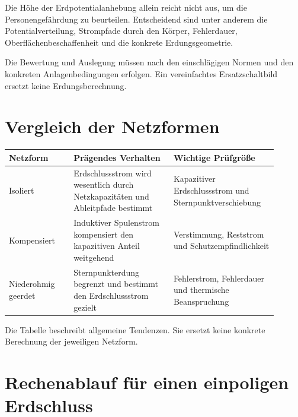 Die Höhe der Erdpotentialanhebung allein reicht nicht aus, um die
Personengefährdung zu beurteilen. Entscheidend sind unter anderem die
Potentialverteilung, Strompfade durch den Körper, Fehlerdauer,
Oberflächenbeschaffenheit und die konkrete Erdungsgeometrie.

Die Bewertung und Auslegung müssen nach den einschlägigen Normen und
den konkreten Anlagenbedingungen erfolgen. Ein vereinfachtes
Ersatzschaltbild ersetzt keine Erdungsberechnung.

\section{Vergleich der Netzformen}

\begin{center}
\begin{tabular}{p{0.22\linewidth}p{0.34\linewidth}p{0.34\linewidth}}
\hline
\textbf{Netzform} & \textbf{Prägendes Verhalten} & \textbf{Wichtige Prüfgröße}\\
\hline
Isoliert &
Erdschlussstrom wird wesentlich durch Netzkapazitäten und Ableitpfade bestimmt &
Kapazitiver Erdschlussstrom und Sternpunktverschiebung\\
\hline
Kompensiert &
Induktiver Spulenstrom kompensiert den kapazitiven Anteil weitgehend &
Verstimmung, Reststrom und Schutzempfindlichkeit\\
\hline
Niederohmig geerdet &
Sternpunkterdung begrenzt und bestimmt den Erdschlussstrom gezielt &
Fehlerstrom, Fehlerdauer und thermische Beanspruchung\\
\hline
\end{tabular}
\end{center}

Die Tabelle beschreibt allgemeine Tendenzen. Sie ersetzt keine konkrete
Berechnung der jeweiligen Netzform.

\section{Rechenablauf für einen einpoligen Erdschluss}


